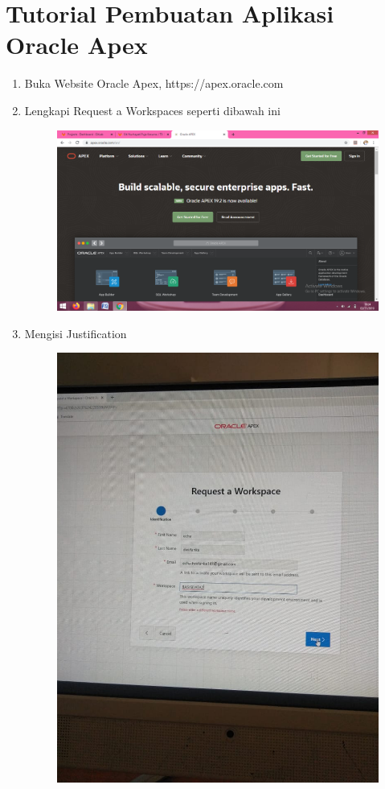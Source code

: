 \chapter*{Tutorial Pembuatan Aplikasi Oracle Apex}

\begin{enumerate}
	\item Buka Website Oracle Apex,  https://apex.oracle.com

	\item Lengkapi Request a Workspaces seperti dibawah ini 
	\begin{figure} [!htbp]
	\includegraphics[scale=0.2]{section/gambar/a.png}
	\centering
	\end{figure}

	\item Mengisi Justification
	\begin{figure} [!htbp]
	\includegraphics[scale=0.2]{section/gambar/1.jpeg}
	\centering
	\end{figure}
	

\end{enumerate}
